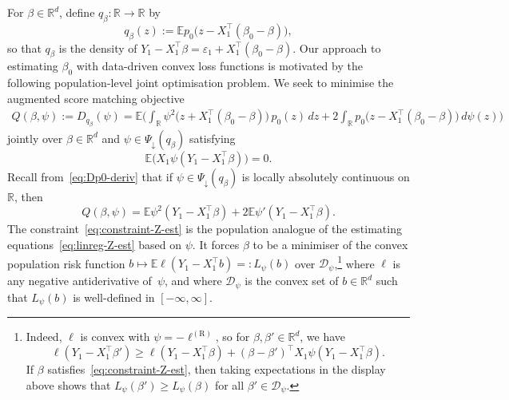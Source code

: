 \documentclass[a4paper]{article}
\newcommand{\R}{\mathbb{R}}
\newcommand{\E}{\mathbb{E}}
\theoremstyle{definition}
\begin{document}
For $\beta \in \R^d$, define $q_\beta \colon \R \to \R$ by
\[
q_\beta(z) := \E p_0\bigl(z - X_1^\top(\beta_0 - \beta)\bigr),
\]
so that $q_\beta$ is the density of $Y_1 - X_1^\top\beta = \varepsilon_1 + X_1^\top(\beta_0 - \beta)$. Our approach to estimating $\beta_0$ with data-driven convex loss functions is motivated by the following population-level joint optimisation problem. We seek to minimise the augmented score matching objective
\begin{align}
\label{eq:Q-beta-psi}
Q(\beta,\psi) := D_{q_\beta}(\psi) = \E\biggl(\int_\R \psi^2\bigl(z + X_1^\top(\beta_0 - \beta)\bigr)\,p_0(z)\,dz + 2\int_\R p_0\bigl(z - X_1^\top(\beta_0 - \beta)\bigr)\,d\psi(z)\biggr)
\end{align}
jointly over $\beta \in \R^d$ and $\psi \in \Psi_\downarrow(q_\beta)$ satisfying 
\begin{equation}
\label{eq:constraint-Z-est}
\E\bigl(X_1 \psi(Y_1 - X_1^\top \beta)\bigr) = 0.
\end{equation}
Recall from~\eqref{eq:Dp0-deriv} that if $\psi \in \Psi_\downarrow(q_\beta)$ is locally absolutely continuous on $\R$, then 
\[
Q(\beta,\psi) = \E\psi^2(Y_1 - X_1^\top\beta) + 2\E\psi'(Y_1 - X_1^\top\beta).
\]
The constraint~\eqref{eq:constraint-Z-est} is the population analogue of the estimating equations~\eqref{eq:linreg-Z-est} based on $\psi$. It forces $\beta$ to be a minimiser of the convex population risk function $b \mapsto \E\ell(Y_1 - X_1^\top b) =: L_\psi(b)$ over $\mathcal{D}_\psi$,\footnote{\label{footnote:population-risk}Indeed, $\ell$ is convex with $\psi = -\ell^{(\mathrm{R})}$, so for $\beta,\beta' \in \R^d$, we have
\[
\ell(Y_1 - X_1^\top\beta') \geq \ell(Y_1 - X_1^\top\beta) + (\beta - \beta')^\top X_1\psi(Y_1 - X_1^\top\beta).
\]
If $\beta$ satisfies~\eqref{eq:constraint-Z-est}, then taking expectations in the display above shows that $L_\psi(\beta') \geq L_\psi(\beta)$ for all $\beta' \in \mathcal{D}_\psi$.} where $\ell$ is any negative antiderivative of~$\psi$, and where $\mathcal{D}_\psi$ is the convex set of $b \in \R^d$ such that $L_\psi(b)$ is well-defined in $[-\infty,\infty]$.
\end{document}
